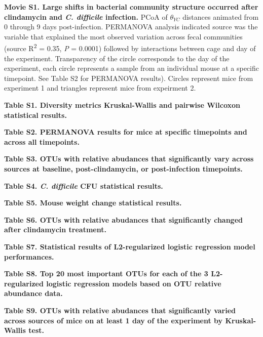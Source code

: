 \documentclass[11pt,]{article}
\begin{document}
\textbf{Movie S1. Large shifts in bacterial community structure occurred
after clindamycin and \emph{C. difficile} infection.} PCoA of
\(\theta_{YC}\) distances animated from 0 through 9 days post-infection.
PERMANOVA analysis indicated source was the variable that explained the
most observed variation across fecal communities (source
R\textsuperscript{2} = 0.35, \emph{P} = 0.0001) followed by interactions
between cage and day of the experiment. Transparency of the circle
corresponds to the day of the experiment, each circle represents a
sample from an individual mouse at a specific timepoint. See Table S2
for PERMANOVA results). Circles represent mice from experiment 1 and
triangles represent mice from expeirment 2.

\textbf{Table S1. Diversity metrics Kruskal-Wallis and pairwise Wilcoxon
statistical results.}

\textbf{Table S2. PERMANOVA results for mice at specific timepoints and
across all timepoints.}

\textbf{Table S3. OTUs with relative abudances that significantly vary
across sources at baseline, post-clindamycin, or post-infection
timepoints.}

\textbf{Table S4. \emph{C. difficile} CFU statistical results.}

\textbf{Table S5. Mouse weight change statistical results.}

\textbf{Table S6. OTUs with relative abudances that significantly
changed after clindamycin treatment.}

\textbf{Table S7. Statistical results of L2-regularized logistic
regression model performances.}

\textbf{Table S8. Top 20 most important OTUs for each of the 3
L2-regularized logistic regression models based on OTU relative
abundance data.}

\textbf{Table S9. OTUs with relative abudances that significantly varied
across sources of mice on at least 1 day of the experiment by
Kruskal-Wallis test.}
\end{document}
